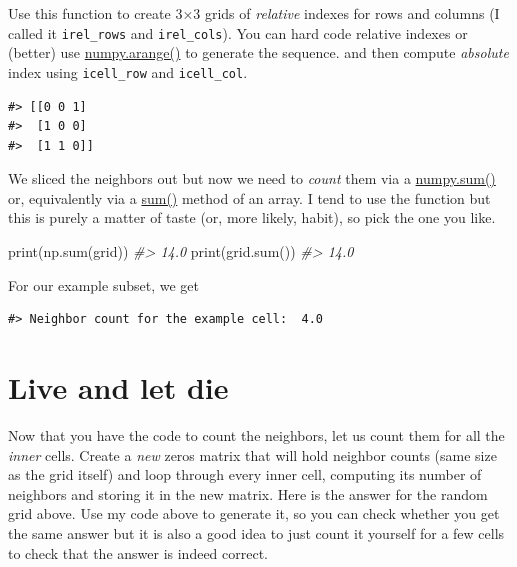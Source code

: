 \documentclass[
]{book}
\newenvironment{Shaded}{\begin{snugshade}}{\end{snugshade}}
\newcommand{\BuiltInTok}[1]{#1}
\newcommand{\CommentTok}[1]{\textcolor[rgb]{0.56,0.35,0.01}{\textit{#1}}}
\newcommand{\NormalTok}[1]{#1}
\begin{document}
Use this function to create 3×3 grids of \emph{relative} indexes for rows and columns (I called it \texttt{irel\_rows} and \texttt{irel\_cols}). You can hard code relative indexes or (better) use \href{https://numpy.org/doc/stable/reference/generated/numpy.arange.html?highlight=arange}{numpy.arange()} to generate the sequence.
and then compute \emph{absolute} index using \texttt{icell\_row} and \texttt{icell\_col}.

\begin{verbatim}
#> [[0 0 1]
#>  [1 0 0]
#>  [1 1 0]]
\end{verbatim}

We sliced the neighbors out but now we need to \emph{count} them via a \href{https://numpy.org/doc/stable/reference/generated/numpy.sum.html}{numpy.sum()} or, equivalently via a \href{https://numpy.org/doc/stable/reference/generated/numpy.ndarray.sum.html}{sum()} method of an array. I tend to use the function but this is purely a matter of taste (or, more likely, habit), so pick the one you like.

\begin{Shaded}
\begin{Highlighting}[]
\BuiltInTok{print}\NormalTok{(np.}\BuiltInTok{sum}\NormalTok{(grid))}
\CommentTok{\#\textgreater{} 14.0}
\BuiltInTok{print}\NormalTok{(grid.}\BuiltInTok{sum}\NormalTok{())}
\CommentTok{\#\textgreater{} 14.0}
\end{Highlighting}
\end{Shaded}

For our example subset, we get

\begin{verbatim}
#> Neighbor count for the example cell:  4.0
\end{verbatim}

\hypertarget{live-and-let-die}{%
\section{Live and let die}\label{live-and-let-die}}

Now that you have the code to count the neighbors, let us count them for all the \emph{inner} cells. Create a \emph{new} zeros matrix that will hold neighbor counts (same size as the grid itself) and loop through every inner cell, computing its number of neighbors and storing it in the new matrix. Here is the answer for the random grid above. Use my code above to generate it, so you can check whether you get the same answer but it is also a good idea to just count it yourself for a few cells to check that the answer is indeed correct.
\end{document}

